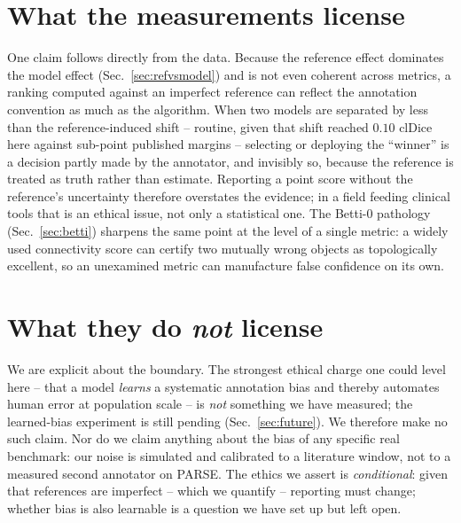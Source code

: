 \documentclass[
    bookmarks, bookmarksnumbered, bookmarksopen,
    colorlinks=true, citecolor=blue, linkcolor=blue, urlcolor=blue
]{techrep}
\begin{document}
\section{What the measurements license}
One claim follows directly from the data. Because the reference effect dominates the model effect
(Sec.~\ref{sec:refvsmodel}) and is not even coherent across metrics, a ranking computed against an
imperfect reference can reflect the annotation convention as much as the algorithm. When two
models are separated by less than the reference-induced shift -- routine, given that shift reached
$0.10$ clDice here against sub-point published margins -- selecting or deploying the ``winner'' is
a decision partly made by the annotator, and invisibly so, because the reference is treated as
truth rather than estimate. Reporting a point score without the reference's uncertainty therefore
overstates the evidence; in a field feeding clinical tools that is an ethical issue, not only a
statistical one. The Betti-$0$ pathology (Sec.~\ref{sec:betti}) sharpens the same point at the
level of a single metric: a widely used connectivity score can certify two mutually wrong objects
as topologically excellent, so an unexamined metric can manufacture false confidence on its own.

\section{What they do \emph{not} license}
We are explicit about the boundary. The strongest ethical charge one could level here -- that a
model \emph{learns} a systematic annotation bias and thereby automates human error at
population scale -- is \emph{not} something we have measured; the learned-bias experiment is
still pending (Sec.~\ref{sec:future}). We therefore make no such claim. Nor do we claim anything
about the bias of any specific real benchmark: our noise is simulated and calibrated to a
literature window, not to a measured second annotator on PARSE. The ethics we assert is
\emph{conditional}: given that references are imperfect -- which we quantify -- reporting must
change; whether bias is also learnable is a question we have set up but left open.
\end{document}
